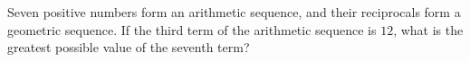 Seven positive numbers form an arithmetic sequence, and their reciprocals form a geometric sequence. If the third term of the arithmetic sequence is $12$, what is the greatest possible value of the seventh term?
